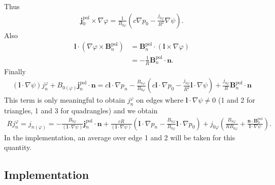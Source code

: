 \documentclass[a4paper, 10pt, english]{article}
\let\temp\vartheta
\let\vartheta\theta
\let\theta\temp
\let\temp\varphi
\let\varphi\phi
\let\phi\temp
\let\vec\symbf
\newcommand*\pol{\ensuremath{\textrm{pol}}}
\begin{document}
Thus
\begin{gather}
  \vec{j}_{0}^{\pol} \times \nabla \phi = \frac{1}{B_{0 \phi}} \left( c \nabla p_{0} - \frac{j_{0 \phi}}{R^{2}} \nabla \psi \right).
\end{gather}
Also
\begin{align}
  \vec{l} \cdot (\nabla \phi \times \vec{B}_{n}^{\pol}) &= \vec{B}_{n}^{\pol} \cdot (\vec{l} \times \nabla \phi) \nonumber \\
  &= -\frac{1}{R} \vec{B}_{n}^{\pol} \cdot \vec{n}.
\end{align}
Finally
\begin{gather}
  (\vec{l} \cdot \nabla \psi) j_{n}^{\phi} + B_{0 (\phi)} \vec{j}_{n}^{\pol} \cdot \vec{n} = c \vec{l} \cdot \nabla p_{n} - \frac{B_{n \phi}}{B_{0 \phi}} \left( c \vec{l} \cdot \nabla p_{0} - \frac{j_{0 \phi}}{R^{2}} \vec{l} \cdot \nabla \psi \right) + \frac{j_{0 \phi}}{R} \vec{B}_{n}^{\pol} \cdot \vec{n} \label{eq:jnxB0-1}
\end{gather}
This term is only meaningful to obtain $j_{n}^{\phi}$ on edges where $\vec{l} \cdot \nabla \psi \neq 0$ (1 and 2 for triangles, 1 and 3 for quadrangles) and we obtain
\begin{gather}
  R j_{n}^{\phi} = j_{n (\phi)} = -\frac{B_{0 \phi}}{(\vec{l} \cdot \nabla \psi)} \vec{j}_{n}^{\pol} \cdot \vec{n} + \frac{c R}{(\vec{l} \cdot \nabla \psi)} \left( \vec{l} \cdot \nabla p_{n} - \frac{B_{n \phi}}{B_{0 \phi}} \vec{l} \cdot \nabla p_{0} \right) + j_{0 \phi} \left( \frac{B_{n \phi}}{R B_{0 \phi}} + \frac{\vec{n} \cdot \vec{B}_{n}^{\pol}}{\vec{l} \cdot \nabla \psi} \right). \label{eq:jnxB0-1-1}
\end{gather}
In the implementation, an average over edge 1 and 2 will be taken for this quantity.

\subsection{Implementation}
\end{document}
